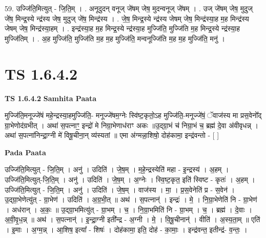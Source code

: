 \documentclass[17pt]{extarticle}
\begin{document}
59. उज्जि॑ति॒मित्युत् - जि॒ति॒म् । . अनूदुदन् वनूज् जे॑षम् जेष॒ मुदन्वनूज् जे॑षम् । . उज् जे॑षम् जेष॒ मुदुज् जे॑ष॒ मिन्द्र॒स्ये न्द्र॑स्य जेष॒ मुदुज् जे॑ष॒ मिन्द्र॑स्य । . जे॒ष॒ मिन्द्र॒स्ये न्द्र॑स्य जेषम् जेष॒ मिन्द्र॑स्या॒ह म॒ह मिन्द्र॑स्य जेषम् जेष॒ मिन्द्र॑स्या॒हम् । . इन्द्र॑स्या॒ह म॒ह मिन्द्र॒स्ये न्द्र॑स्या॒ह मुज्जि॑ति॒ मुज्जि॑ति म॒ह मिन्द्र॒स्ये न्द्र॑स्या॒ह मुज्जि॑तिम् । . अ॒ह मुज्जि॑ति॒ मुज्जि॑ति म॒ह म॒ह मुज्जि॑ति॒ मन्वनूज्जि॑ति म॒ह म॒ह मुज्जि॑ति॒ मनु॑ । \newline
\pagebreak
{}

\section{ TS 1.6.4.2 }

\textbf{TS 1.6.4.2 } \newline
\textbf{Samhita Paata} \newline

मुज्जि॑ति॒मनूज्जे॑षं महे॒न्द्रस्या॒हमुज्जि॑ति॒- मनूज्जे॑षम॒ग्नेः स्वि॑ष्ट॒कृतो॒ऽह मुज्जि॑ति॒-मनूज्जे॑षं॒ ॅवाज॑स्य मा प्रस॒वेनो᳚द् ग्रा॒भेणोद॑ग्रभीत् । अथा॑ स॒पत्नाꣳ॒॒ इन्द्रो॑ मे निग्रा॒भेणाध॑राꣳ अकः ॥उ॒द्ग्रा॒भं च॑ निग्रा॒भं च॒ ब्रह्म॑ दे॒वा अ॑वीवृधन्न् । अथा॑ स॒पत्ना॑निन्द्रा॒ग्नी मे॑ विषू॒चीना॒न् व्य॑स्यतां ॥ एमा अ॑ग्मन्ना॒शिषो॒ दोह॑कामा॒ इन्द्र॑वन्तो - [ ] \newline

\textbf{Pada Paata} \newline

उज्जि॑ति॒मित्युत् - जि॒ति॒म् । अनु॑ । उदिति॑ । जे॒ष॒म् । म॒हे॒न्द्रस्येति॑ महा - इ॒न्द्रस्य॑ । अ॒हम् । उज्जि॑ति॒मित्युत्-जि॒ति॒म् । अनु॑ । उदिति॑ । जे॒ष॒म् । अ॒ग्नेः । स्वि॒ष्ट॒कृत॒ इति॑ स्विष्ट - कृतः॑ । अ॒हम् । उज्जि॑ति॒मित्युत् - जि॒ति॒म् । अनु॑ । उदिति॑ । जे॒ष॒म् । वाज॑स्य । मा॒ । प्र॒स॒वेनेति॑ प्र - स॒वेन॑ । उ॒द्ग्रा॒भेणेत्यु॑त् - ग्रा॒भेण॑ । उदिति॑ । अ॒ग्र॒भी॒त् ॥ अथ॑ । स॒पत्नान्॑ । इन्द्रः॑ । मे॒ । नि॒ग्रा॒भेणेति॑ नि - ग्रा॒भेण॑ । अध॑रान् । अ॒कः॒ ॥ उ॒द्ग्रा॒भमित्यु॑त् - ग्रा॒भम् । च॒ । नि॒ग्रा॒भमिति॑ नि - ग्रा॒भम् । च॒ । ब्रह्म॑ । दे॒वाः । अ॒वी॒वृ॒ध॒न्न् ॥ अथ॑ । स॒पत्नान्॑ । इ॒न्द्रा॒ग्नी इती᳚न्द्र - अ॒ग्नी । मे॒ । वि॒षू॒चीनान्॑ । वीति॑ । अ॒स्य॒ता॒म् ॥ एति॑ । इ॒माः । अ॒ग्म॒न्न् । आ॒शिष॒ इत्या᳚ - शिषः॑ । दोह॑कामा॒ इति॒ दोह॑ - का॒माः॒ । इन्द्र॑वन्त॒ इतीन्द्र॑- व॒न्तः॒ ।  \newline
\end{document}
